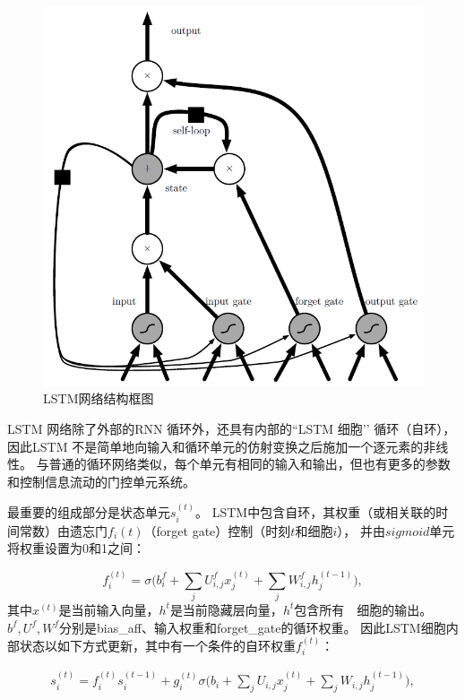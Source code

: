 \begin{figure}[!h]
	\centering
	\includegraphics[scale=0.5]{figures/chapter_2/fig_2_6_1.png}
	\caption{LSTM网络结构框图}\label{sec:fig_2_6}
\end{figure}

LSTM 网络除了外部的RNN 循环外，还具有内部的“LSTM 细胞’’ 循环（自环），
因此LSTM 不是简单地向输入和循环单元的仿射变换之后施加一个逐元素的非线性。
与普通的循环网络类似，每个单元有相同的输入和输出，但也有更多的参数和控制信息流动的门控单元系统。

最重要的组成部分是状态单元$s_i^{(t)}$。
LSTM中包含自环，其权重（或相关联的时间常数）由遗忘门$f_i{(t)}$（forget gate）控制（时刻$t$和细胞$i$），
并由$sigmoid$单元将权重设置为0和1之间：\par
\begin{equation}
f_i^{(t)} = \sigma \Big( b_i^f + \sum_j U_{i,j}^f x_j^{(t)} + \sum_j W_{i,j}^f h_j^{(t-1)} \Big),
\end{equation}
其中$x^{(t)}$是当前输入向量，$h^{t}$是当前隐藏层向量，$h^{t}$包含所有~~细胞的输出。 
$b^f, U^f, W^f$分别是\gls{bias_aff}、输入权重和\gls{forget_gate}的循环权重。
因此LSTM细胞内部状态以如下方式更新，其中有一个条件的自环权重$f_i^{(t)}$：\par
\begin{equation}
	\begin{aligned}
		s_i^{(t)} = f_i^{(t)}  s_i^{(t-1)} +  g_i^{(t)}
		\sigma \Big( b_i + \sum_j U_{i,j} x_j^{(t)} + \sum_j W_{i,j} h_j^{(t-1)} \Big),
	\end{aligned}
\end{equation}

